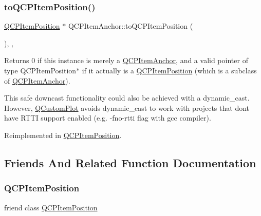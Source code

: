 \mbox{\label{class_q_c_p_item_anchor_ac54b20120669950255a63587193dbb86}} 
\subsubsection{\texorpdfstring{to\+Q\+C\+P\+Item\+Position()}{toQCPItemPosition()}}
{\footnotesize\ttfamily \hyperlink{class_q_c_p_item_position}{Q\+C\+P\+Item\+Position} $\ast$ Q\+C\+P\+Item\+Anchor\+::to\+Q\+C\+P\+Item\+Position (\begin{DoxyParamCaption}{ }\end{DoxyParamCaption})\hspace{0.3cm}{\ttfamily [inline]}, {\ttfamily [protected]}, {\ttfamily [virtual]}}

Returns 0 if this instance is merely a \hyperlink{class_q_c_p_item_anchor}{Q\+C\+P\+Item\+Anchor}, and a valid pointer of type Q\+C\+P\+Item\+Position$\ast$ if it actually is a \hyperlink{class_q_c_p_item_position}{Q\+C\+P\+Item\+Position} (which is a subclass of \hyperlink{class_q_c_p_item_anchor}{Q\+C\+P\+Item\+Anchor}).

This safe downcast functionality could also be achieved with a dynamic\+\_\+cast. However, \hyperlink{class_q_custom_plot}{Q\+Custom\+Plot} avoids dynamic\+\_\+cast to work with projects that don\textquotesingle{}t have R\+T\+TI support enabled (e.\+g. -\/fno-\/rtti flag with gcc compiler). 

Reimplemented in \hyperlink{class_q_c_p_item_position_a008ff9ebe645a963671b68bcf7f7a1c0}{Q\+C\+P\+Item\+Position}.



\subsection{Friends And Related Function Documentation}
\mbox{\label{class_q_c_p_item_anchor_aa9b8ddc062778e202a0be06a57d18d17}} 
\subsubsection{\texorpdfstring{Q\+C\+P\+Item\+Position}{QCPItemPosition}}
{\footnotesize\ttfamily friend class \hyperlink{class_q_c_p_item_position}{Q\+C\+P\+Item\+Position}\hspace{0.3cm}{\ttfamily [friend]}}



